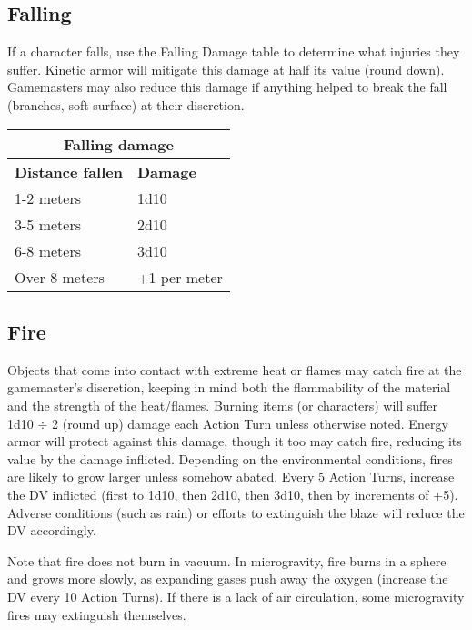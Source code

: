 \subsection{Falling}
\label{sec:falling}

If a character falls, use the Falling Damage table to determine what injuries they suffer. Kinetic armor will mitigate this damage at half its value (round down). Gamemasters may also reduce this damage if anything helped to break the fall (branches, soft surface) at their discretion.

\begin{table}
\begin{tabular}{|l|l|}
\hline
\multicolumn{2}{|c|}{\textbf{Falling damage}}	\\
\hline
\textbf{Distance fallen}		& \textbf{Damage}	\\
\hline
1-2 meters				& 1d10			\\
\hline
3-5 meters				& 2d10			\\
\hline
6-8 meters				& 3d10			\\
\hline
Over 8 meters				& +1 per meter		\\
\hline
\end{tabular}
\label{tab:falling-damage}
\end{table}


\subsection{Fire}
\label{sec:fire}

Objects that come into contact with extreme heat or flames may catch fire at the gamemaster’s discretion, keeping in mind both the flammability of the material and the strength of the heat/flames. Burning items (or characters) will suffer 1d10 $\div$ 2 (round up) damage each Action Turn unless otherwise noted. Energy armor will protect against this damage, though it too may catch fire, reducing its value by the damage inflicted. Depending on the environmental conditions, fires are likely to grow larger unless somehow abated. Every 5 Action Turns, increase the DV inflicted (first to 1d10, then 2d10, then 3d10, then by increments of +5). Adverse conditions (such as rain) or efforts to extinguish the blaze will reduce the DV accordingly.

Note that fire does not burn in vacuum. In microgravity, fire burns in a sphere and grows more slowly, as expanding gases push away the oxygen (increase the DV every 10 Action Turns). If there is a lack of air circulation, some microgravity fires may extinguish themselves.



